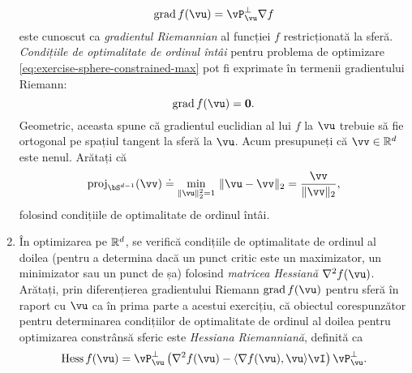 \documentclass[../../book-main_ro.tex]{subfiles}
\begin{document}
\begin{exercise}
\begin{enumerate}
        \begin{equation}\label{eq:exercise-riemann-grad-sphere}
        \mathrm{grad}\, f(\vu) = \vP_{\vu}^\perp \nabla f
        \end{equation}
        este cunoscut ca \textit{gradientul Riemannian} al funcției $f$ restricționată la sferă.
        \textit{Condițiile de optimalitate de ordinul întâi} pentru problema de optimizare \eqref{eq:exercise-sphere-constrained-max} pot fi exprimate în termenii gradientului Riemann:
        \begin{equation*}
            \mathrm{grad}\, f(\vu) = \mathbf{0}.
        \end{equation*}
        Geometric, aceasta spune că gradientul euclidian al lui $f$ la $\vu$ trebuie să fie ortogonal pe spațiul tangent la sferă la $\vu$.
        Acum presupuneți că $\vv \in \R^d$ este nenul. Arătați că
        \begin{equation*}
            \mathrm{proj}_{\bS^{d-1}}(\vv) \doteq
            \min_{\norm{\vu}_2^2 = 1}\, \norm{\vu - \vv}_2 
            =
            \frac{\vv}{\norm{\vv}_2},
        \end{equation*}
        folosind condițiile de optimalitate de ordinul întâi.
        \item În optimizarea pe $\mathbb{R}^d$, se verifică condițiile de optimalitate de ordinul al doilea (pentru a determina dacă un punct critic este un maximizator, un minimizator sau un punct de șa) folosind \textit{matricea Hessiană} $\nabla^2 f(\vu)$.
        Arătați, prin diferențierea gradientului Riemann $\mathrm{grad}\, f(\vu)$ pentru sferă în raport cu $\vu$ ca în prima parte a acestui exercițiu, că obiectul corespunzător pentru determinarea condițiilor de optimalitate de ordinul al doilea pentru optimizarea constrânsă sferic este \textit{Hessiana Riemanniană}, definită ca
        \begin{equation}\label{eq:exercise-riemann-hess-sphere}
            \mathrm{Hess}\, f(\vu) = \vP_{\vu}^\perp \left( 
            \nabla^2 f(\vu) - \ip{\nabla f(\vu)}{\vu} \vI
            \right) \vP_{\vu}^\perp.
        \end{equation}
    \end{enumerate}
\end{exercise}
\end{document}
